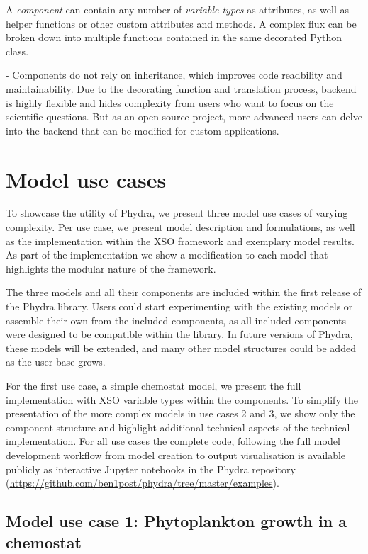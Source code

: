 \documentclass[journal abbreviation, manuscript]{copernicus}
\begin{document}
A \textit{component} can contain any number of \textit{variable types} as attributes, as well as helper functions or other custom attributes and methods. A complex flux can be broken down into multiple functions contained in the same decorated Python class.

- Components do not rely on inheritance, which improves code readbility and maintainability. Due to the decorating function and translation process, backend is highly flexible and hides complexity from users who want to focus on the scientific questions. But as an open-source project, more advanced users can delve into the backend that can be modified for custom applications.


\section{Model use cases} \label{Section:UseCases}

To showcase the utility of Phydra, we present three model use cases of varying complexity. Per use case, we present model description and formulations, as well as the implementation within the XSO framework and exemplary model results. As part of the implementation we show a modification to each model that highlights the modular nature of the framework.

The three models and all their components are included within the first release of the Phydra library. Users could start experimenting with the existing models or assemble their own from the included components, as all included components were designed to be compatible within the library. In future versions of Phydra, these models will be extended, and many other model structures could be added as the user base grows.

For the first use case, a simple chemostat model, we present the full implementation with XSO variable types within the components. To simplify the presentation of the more complex models in use cases 2 and 3, we show only the component structure and highlight additional technical aspects of the technical implementation. For all use cases the complete code, following the full model development workflow from model creation to output visualisation is available publicly as interactive Jupyter notebooks in the Phydra repository (\url{https://github.com/ben1post/phydra/tree/master/examples}).

\subsection{Model use case 1: Phytoplankton growth in a chemostat}
\end{document}
